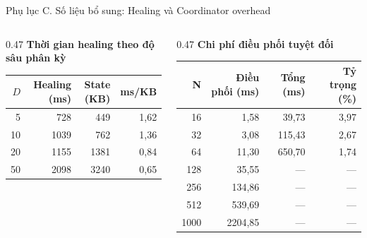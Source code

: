 \documentclass[t, aspectratio=169]{beamer}
\begin{document}
\begin{frame}[c]{Phụ lục C. Số liệu bổ sung: Healing và Coordinator overhead}
	\footnotesize
	\begin{columns}[t]
		\begin{column}{0.47\textwidth}
			\centering
			\textbf{Thời gian healing theo độ sâu phân kỳ}\\[0.2em]
			\scriptsize
			\renewcommand{\arraystretch}{1.1}
			\setlength{\tabcolsep}{7pt}
			\begin{tabular}{|r|r|r|r|}
				\hline
				\textbf{$D$} & \textbf{Healing (ms)} & \textbf{State (KB)} & \textbf{ms/KB} \\
				\hline
				5 & 728 & 449 & 1,62 \\
				\hline
				10 & 1039 & 762 & 1,36 \\
				\hline
				20 & 1155 & 1381 & 0,84 \\
				\hline
				50 & 2098 & 3240 & 0,65 \\
				\hline
			\end{tabular}
		\end{column}
		\begin{column}{0.47\textwidth}
			\centering
			\textbf{Chi phí điều phối tuyệt đối}\\[0.2em]
			\scriptsize
			\renewcommand{\arraystretch}{1.1}
			\setlength{\tabcolsep}{4pt}
			\begin{tabular}{|r|r|r|r|}
				\hline
				\textbf{N} & \textbf{Điều phối (ms)} & \textbf{Tổng (ms)} & \textbf{Tỷ trọng (\%)} \\
				\hline
				16 & 1,58 & 39,73 & 3,97 \\
				\hline
				32 & 3,08 & 115,43 & 2,67 \\
				\hline
				64 & 11,30 & 650,70 & 1,74 \\
				\hline
				128 & 35,55 & --- & --- \\
				\hline
				256 & 134,86 & --- & --- \\
				\hline
				512 & 539,69 & --- & --- \\
				\hline
				1000 & 2204,85 & --- & --- \\
				\hline
			\end{tabular}
		\end{column}
	\end{columns}
	\vspace{0.2em}
\end{frame}

\hustthankyou
\end{document}
